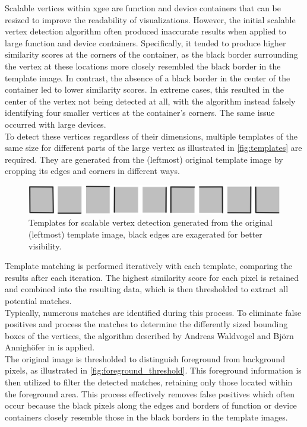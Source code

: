 Scalable vertices within \acrshort{xgee} are function and device containers that can be resized to improve the readability of visualizations. However, the initial scalable vertex detection algorithm often produced inaccurate results when applied to large function and device containers. Specifically, it tended to produce higher similarity scores at the corners of the container, as the black border surrounding the vertex at these locations more closely resembled the black border in the template image. In contrast, the absence of a black border in the center of the container led to lower similarity scores. In extreme cases, this resulted in the center of the vertex not being detected at all, with the algorithm instead falsely identifying four smaller vertices at the container's corners. The same issue occurred with large devices.\\
To detect these vertices regardless of their dimensions, multiple templates of the same size for different parts of the large vertex as illustrated in \autoref{fig:templates} are required. They are generated from the (leftmost) original template image by cropping its edges and corners in different ways.
\begin{figure}[ht]
    \centering
    \includegraphics[width=0.85\linewidth]{pictures/templates.png}
    \caption{Templates for scalable vertex detection generated from the original (leftmost) template image, black edges are exagerated for better visibility.}
    \label{fig:templates}
\end{figure}
Template matching is performed iteratively with each template, comparing the results after each iteration. The highest similarity score for each pixel is retained and combined into the resulting data, which is then thresholded to extract all potential matches.\\
Typically, numerous matches are identified during this process. To eliminate false positives and process the matches to determine the differently sized bounding boxes of the vertices, the algorithm described by Andreas Waldvogel and Bj{\"o}rn Annigh{\"o}fer in \cite{waldvogel_annighoefer_models_2024} is applied.\\
The original image is thresholded to distinguish foreground from background pixels, as illustrated in \autoref{fig:foreground_threshold}. This foreground information is then utilized to filter the detected matches, retaining only those located within the foreground area. This process effectively removes false positives which often occur because the black pixels along the edges and borders of function or device containers closely resemble those in the black borders in the template images.
